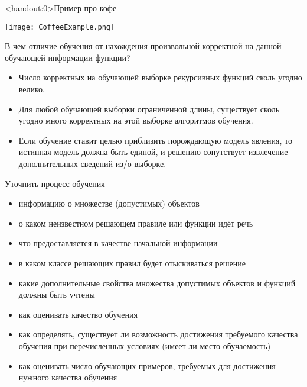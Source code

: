 \documentclass[pdf, intlimits, 9pt, unicode]{beamer}
\begin{document}
\begin{frame}<handout:0>{Пример про кофе}
\begin{center}\texttt{[image: CoffeeExample.png]}\end{center}
\end{frame}




\begin{frame}
В чем отличие обучения от нахождения произвольной корректной на данной обучающей информации функции?\pause

\begin{itemize}
\item Число корректных на обучающей выборке рекурсивных функций сколь угодно велико.\pause
\item Для любой обучающей выборки ограниченной длины, существует сколь угодно много корректных на этой выборке алгоритмов обучения.\pause
\item Если обучение ставит целью {\color{red}приблизить порождающую модель явления}, то истинная модель должна быть единой\pause, и решению сопутствует извлечение дополнительных сведений из/о выборке.
\end{itemize}
\end{frame}




\begin{frame}{Уточнить процесс обучения}

\begin{itemize}
\item информацию о множестве (допустимых) объектов\pause
\item о каком неизвестном решающем правиле или функции идёт речь\pause
\item что предоставляется в качестве начальной информации\pause
\item в каком классе решающих правил будет отыскиваться решение\pause
\item какие дополнительные свойства множества допустимых объектов и функций должны быть учтены\pause
\item как оценивать качество обучения\pause
\item как определять, существует ли возможность достижения требуемого качества обучения при перечисленных условиях (имеет ли место обучаемость)\pause
\item как оценивать число обучающих примеров, требуемых для достижения нужного качества обучения
\end{itemize}
\end{frame}
\end{document}
